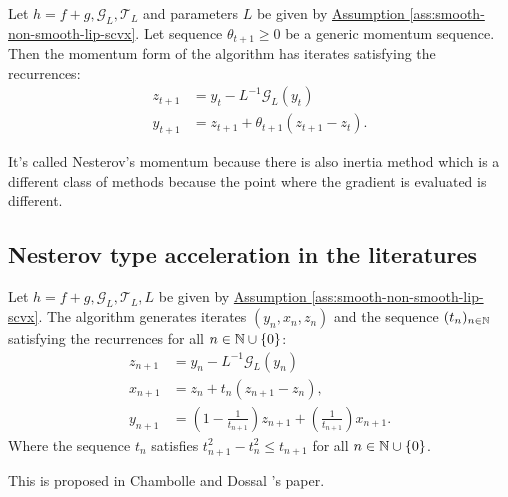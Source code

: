 \documentclass[12pt]{article}
\begin{document}
        \begin{definition}\label{def:generic-nesterov-momentum-form}
            Let $h = f + g, \mathcal G_L, \mathcal T_L$ and parameters $L$ be given by 
            \hyperref[ass:smooth-non-smooth-lip-scvx]
            {Assumption \ref*{ass:smooth-non-smooth-lip-scvx}}. 
            Let sequence $\theta_{t + 1} \ge 0$ be a generic momentum sequence. 
            Then the momentum form of the algorithm has iterates satisfying the recurrences: 
            $$
            \begin{aligned}
                z_{t + 1} &= y_t - L^{-1}\mathcal G_L(y_t)
                \\
                y_{t + 1 } &= z_{t + 1} + \theta_{t + 1}(z_{t + 1} - z_t). 
            \end{aligned}
            $$
        \end{definition}
        \begin{remark}
            It's called Nesterov's momentum because there is also inertia method which is a different class of methods because the point where the gradient is evaluated is different. 
        \end{remark}

    \subsection{Nesterov type acceleration in the literatures}
        \begin{definition}\label{def:chambolle-dossal-2015}
            Let $h = f + g, \mathcal G_L, \mathcal T_L, L$ be given by 
            \hyperref[ass:smooth-non-smooth-lip-scvx]
            {Assumption \ref*{ass:smooth-non-smooth-lip-scvx}}. 
            The algorithm generates iterates $(y_n, x_n, z_n)$ and the sequence $(t_n)_{n \in \mathbb N}$ satisfying the recurrences for all $n \in \mathbb N \cup \{0\}$: 
            \begin{align}
                z_{n + 1} &= y_n - L^{-1}\mathcal G_L(y_n)
                \\
                x_{n + 1} &= z_n + t_{n} (z_{n + 1} - z_n), 
                \\
                y_{n + 1} &= \left(
                    1 - \frac{1}{t_{n + 1}}
                \right)z_{n + 1} + \left(
                    \frac{1}{t_{n + 1}}
                \right)x_{n + 1}. 
            \end{align}
            Where the sequence $t_n$ satisfies $t_{n + 1}^2 - t_n^2 \le t_{n + 1}$ for all $n \in \mathbb N\cup \{0\}$. 
        \end{definition}
        \begin{remark}
            This is proposed in Chambolle and Dossal \cite{chambolle_convergence_2015}'s paper. 
        \end{remark}
\end{document}
